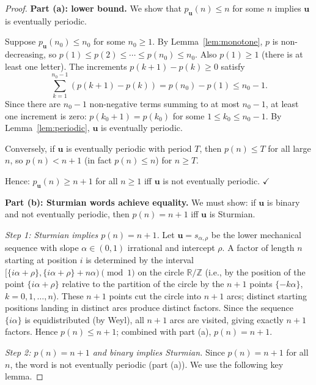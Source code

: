 \begin{proof}
  \textbf{Part (a): lower bound.}
  We show that \(p_{\mathbf{u}}(n)\leq n\) for some \(n\) implies
  \(\mathbf{u}\) is eventually periodic.

  Suppose \(p_{\mathbf{u}}(n_0)\leq n_0\) for some \(n_0\geq 1\).
  By Lemma~\ref{lem:monotone}, \(p\) is non-decreasing, so
  \(p(1)\leq p(2)\leq\cdots\leq p(n_0)\leq n_0\).  Also
  \(p(1)\geq 1\) (there is at least one letter).  The increments
  \(p(k+1)-p(k)\geq 0\) satisfy
  \[
    \sum_{k=1}^{n_0-1}(p(k+1)-p(k)) = p(n_0)-p(1)\leq n_0-1.
  \]
  Since there are \(n_0-1\) non-negative terms summing to at most
  \(n_0-1\), at least one increment is zero: \(p(k_0+1)=p(k_0)\)
  for some \(1\leq k_0\leq n_0-1\).  By Lemma~\ref{lem:periodic},
  \(\mathbf{u}\) is eventually periodic.

  Conversely, if \(\mathbf{u}\) is eventually periodic with period
  \(T\), then \(p(n)\leq T\) for all large \(n\), so
  \(p(n)<n+1\) (in fact \(p(n)\leq n\)) for \(n\geq T\).

  Hence: \(p_{\mathbf{u}}(n)\geq n+1\) for all \(n\geq 1\) iff
  \(\mathbf{u}\) is not eventually periodic. \(\checkmark\)

  \textbf{Part (b): Sturmian words achieve equality.}
  We must show: if \(\mathbf{u}\) is binary and not eventually
  periodic, then \(p(n)=n+1\) iff \(\mathbf{u}\) is Sturmian.

  \emph{Step 1: Sturmian implies \(p(n)=n+1\).}
  Let \(\mathbf{u}=s_{\alpha,\rho}\) be the lower mechanical sequence
  with slope \(\alpha\in(0,1)\) irrational and intercept \(\rho\).
  A factor of length \(n\) starting at position \(i\) is determined
  by the interval \([\{i\alpha+\rho\},\{i\alpha+\rho\}+n\alpha)\pmod{1}\)
  on the circle \(\mathbb{R}/\mathbb{Z}\) (i.e., by the position of the
  point \(\{i\alpha+\rho\}\) relative to the partition of the circle
  by the \(n+1\) points \(\{-k\alpha\}\), \(k=0,1,\ldots,n\)).
  These \(n+1\) points cut the circle into \(n+1\) arcs; distinct
  starting positions landing in distinct arcs produce distinct factors.
  Since the sequence \(\{i\alpha\}\) is equidistributed (by Weyl),
  all \(n+1\) arcs are visited, giving exactly \(n+1\) factors.
  Hence \(p(n)\leq n+1\); combined with part (a), \(p(n)=n+1\).

  \emph{Step 2: \(p(n)=n+1\) and binary implies Sturmian.}
  Since \(p(n)=n+1\) for all \(n\), the word is not eventually
  periodic (part (a)).  We use the following key lemma.


\end{proof}
